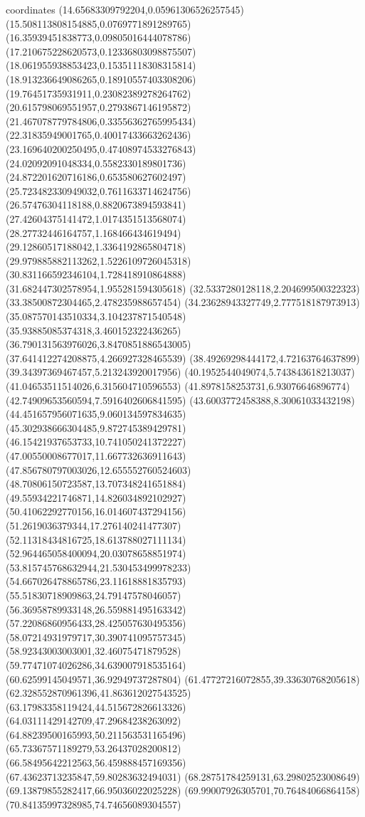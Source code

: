 coordinates {%
(14.65683309792204,0.05961306526257545)
(15.508113808154885,0.0769771891289765)
(16.35939451838773,0.09805016444078786)
(17.210675228620573,0.12336803098875507)
(18.061955938853423,0.15351118308315814)
(18.913236649086265,0.18910557403308206)
(19.76451735931911,0.23082389278264762)
(20.615798069551957,0.2793867146195872)
(21.467078779784806,0.33556362765995434)
(22.31835949001765,0.40017433663262436)
(23.169640200250495,0.47408974533276843)
(24.02092091048334,0.5582330189801736)
(24.872201620716186,0.653580627602497)
(25.723482330949032,0.7611633714624756)
(26.57476304118188,0.8820673894593841)
(27.42604375141472,1.0174351513568074)
(28.27732446164757,1.168466434619494)
(29.12860517188042,1.3364192865804718)
(29.979885882113262,1.5226109726045318)
(30.831166592346104,1.728418910864888)
(31.682447302578954,1.955281594305618)
(32.5337280128118,2.204699500322323)
(33.38500872304465,2.478235988657454)
(34.23628943327749,2.777518187973913)
(35.087570143510334,3.104237871540548)
(35.93885085374318,3.460152322436265)
(36.790131563976026,3.8470851886543005)
(37.641412274208875,4.266927328465539)
(38.49269298444172,4.72163764637899)
(39.34397369467457,5.213243920017956)
(40.1952544049074,5.743843618213037)
(41.04653511514026,6.315604710596553)
(41.8978158253731,6.93076646896774)
(42.74909653560594,7.5916402606841595)
(43.6003772458388,8.30061033432198)
(44.451657956071635,9.060134597834635)
(45.302938666304485,9.872745389429781)
(46.15421937653733,10.741050241372227)
(47.00550008677017,11.667732636911643)
(47.856780797003026,12.655552760524603)
(48.70806150723587,13.707348241651884)
(49.55934221746871,14.826034892102927)
(50.41062292770156,16.014607437294156)
(51.2619036379344,17.276140241477307)
(52.11318434816725,18.613788027111134)
(52.964465058400094,20.03078658851974)
(53.815745768632944,21.530453499978233)
(54.667026478865786,23.11618881835793)
(55.51830718909863,24.79147578046057)
(56.36958789933148,26.559881495163342)
(57.22086860956433,28.425057630495356)
(58.07214931979717,30.390741095757345)
(58.92343003003001,32.46075471879528)
(59.77471074026286,34.639007918535164)
(60.62599145049571,36.92949737287804)
(61.47727216072855,39.33630768205618)
(62.328552870961396,41.863612027543525)
(63.17983358119424,44.515672826613326)
(64.03111429142709,47.29684238263092)
(64.88239500165993,50.211563531165496)
(65.73367571189279,53.26437028200812)
(66.58495642212563,56.459888457169356)
(67.43623713235847,59.80283632494031)
(68.28751784259131,63.29802523008649)
(69.13879855282417,66.95036022025228)
(69.99007926305701,70.76484066864158)
(70.84135997328985,74.74656089304557)
}
